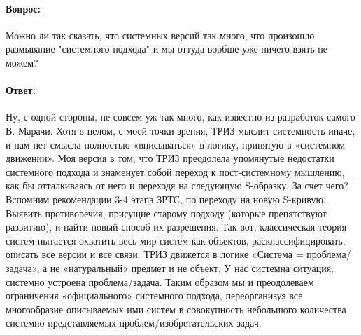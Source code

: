 \documentclass[11pt,a4paper]{article}
\begin{document}
\paragraph{Вопрос:}
Можно ли так сказать, что системных версий так много, что произошло размывание
"системного подхода" и мы оттуда вообще уже ничего взять не можем?

\paragraph{Ответ:}
Ну, с одной стороны, не совсем уж так много, как известно из разработок самого
В. Марачи. Хотя в целом, с моей точки зрения, ТРИЗ мыслит системность иначе, и
нам нет смысла полностью «вписываться» в логику, принятую в «системном
движении». Моя версия в том, что ТРИЗ преодолела упомянутые недостатки
системного подхода и знаменует собой переход к пост-системному мышлению, как
бы отталкиваясь от него и переходя на следующую S-образку. За счет чего?
Вспомним рекомендации 3-4 этапа ЗРТС, по переходу на новую S-кривую. Выявить
противоречия, присущие старому подходу (которые препятствуют развитию), и
найти новый способ их разрешения. Так вот, классическая теория систем пытается
охватить весь мир систем как объектов, расклассифицировать, описать все версии
и все связи. ТРИЗ движется в логике «Система = проблема/задача», а не
«натуральный» предмет и не объект. У нас системна ситуация, системно устроена
проблема/задача. Таким образом мы и преодолеваем ограничения «официального»
системного подхода, переорганизуя все многообразие описываемых ими систем в
совокупность небольшого количества системно представляемых
проблем/изобретательских задач.
\end{document}
